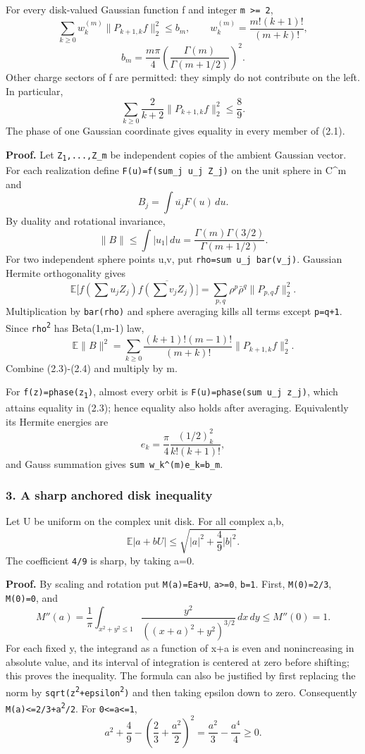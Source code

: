For every disk-valued Gaussian function f and integer
\texttt{m\ \textgreater{}=\ 2}, \[
 \sum_{k\ge0} w_k^{(m)}\|P_{k+1,k}f\|_2^2\le b_m,
 \qquad
 w_k^{(m)}=\frac{m!(k+1)!}{(m+k)!},
\] \[
 b_m=\frac{m\pi}{4}
       \left(\frac{\Gamma(m)}{\Gamma(m+1/2)}\right)^2.
\tag{2.1}
\] Other charge sectors of f are permitted: they simply do not
contribute on the left. In particular, \[
 \sum_{k\ge0}\frac{2}{k+2}\|P_{k+1,k}f\|_2^2\le\frac89.
\tag{2.2}
\] The phase of one Gaussian coordinate gives equality in every member
of (2.1).

\textbf{Proof.} Let \texttt{Z\textsubscript{1},...,Z\_m} be independent copies of the
ambient Gaussian vector. For each realization define
\texttt{F(u)=f(sum\_j\ u\_j\ Z\_j)} on the unit sphere in C\^{}m and \[
 B_j=\int\overline{u_j}F(u)\,du.
\] By duality and rotational invariance, \[
 \|B\|\le\int|u_1|\,du
 =\frac{\Gamma(m)\Gamma(3/2)}{\Gamma(m+1/2)}.
\tag{2.3}
\] For two independent sphere points u,v, put
\texttt{rho=sum\ u\_j\ bar(v\_j)}. Gaussian Hermite orthogonality gives
\[
 \mathbb E\bigl[f(\textstyle\sum u_jZ_j)
       \overline{f(\sum v_jZ_j)}\bigr]
 =\sum_{p,q}\rho^p\bar\rho^q\|P_{p,q}f\|_2^2.
\] Multiplication by \texttt{bar(rho)} and sphere averaging kills all
terms except \texttt{p=q+1}. Since \texttt{\textbar{}rho\textbar{}\textsuperscript{2}} has
Beta(1,m-1) law, \[
 \mathbb E\|B\|^2
 =\sum_{k\ge0}\frac{(k+1)!(m-1)!}{(m+k)!}
                   \|P_{k+1,k}f\|_2^2.
\tag{2.4}
\] Combine (2.3)-(2.4) and multiply by m.

For \texttt{f(z)=phase(z\textsubscript{1})}, almost every orbit is
\texttt{F(u)=phase(sum\ u\_j\ z\_j)}, which attains equality in (2.3);
hence equality also holds after averaging. Equivalently its Hermite
energies are \[
 e_k=\frac\pi4\frac{(1/2)_k^2}{k!(k+1)!},
\] and Gauss summation gives \texttt{sum\ w\_k\^{}(m)e\_k=b\_m}.

\subsubsection{3. A sharp anchored disk
inequality}\label{a-sharp-anchored-disk-inequality}

Let U be uniform on the complex unit disk. For all complex a,b, \[
 \mathbb E|a+bU|\le\sqrt{|a|^2+\frac49|b|^2}.
\tag{3.1}
\] The coefficient \texttt{4/9} is sharp, by taking a=0.

\textbf{Proof.} By scaling and rotation put
\texttt{M(a)=E\textbar{}a+U\textbar{}}, \texttt{a\textgreater{}=0},
\texttt{b=1}. First, \texttt{M(0)=2/3},
\texttt{M\textquotesingle{}(0)=0}, and \[
 M''(a)=\frac1\pi\int_{x^2+y^2\le1}
       \frac{y^2}{((x+a)^2+y^2)^{3/2}}\,dx\,dy\le M''(0)=1.
\] For each fixed y, the integrand as a function of x+a is even and
nonincreasing in absolute value, and its interval of integration is
centered at zero before shifting; this proves the inequality. The
formula can also be justified by first replacing the norm by
\texttt{sqrt(\textbar{}z\textbar{}\textsuperscript{2}+epsilon\textsuperscript{2})} and then taking epsilon
down to zero. Consequently \texttt{M(a)\textless{}=2/3+a\textsuperscript{2}/2}. For
\texttt{0\textless{}=a\textless{}=1}, \[
 a^2+\frac49-\left(\frac23+\frac{a^2}2\right)^2
 =\frac{a^2}3-\frac{a^4}4\ge0.
\]


